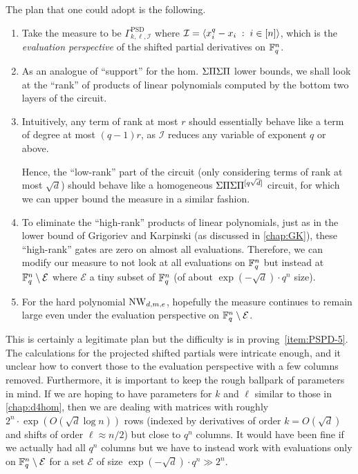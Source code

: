 \noindent 
The plan that one could adopt is the following. 
\begin{enumerate}
\itemsep 0pt
\item\label{item:PSPD-1} Take the measure to be $\Gamma^{\mathrm{PSD}}_{k,\ell,\mathcal{I}}$ where $\mathcal{I} = \left\langle x_i^q - x_i \;:\; i\in [n]\right\rangle$, which is the \emph{evaluation perspective} of the shifted partial derivatives on $\mathbb{F}_q^n$.
\item\label{item:PSPD-2} As an analogue of ``support'' for the hom. $\Sigma\Pi\Sigma\Pi$ lower bounds, we shall look at the ``rank'' of products of linear polynomials computed by the bottom two layers of the circuit. 
\item\label{item:PSPD-3} Intuitively, any term of rank at most $r$ should essentially behave like a term of degree at most $(q-1)r$, as $\mathcal{I}$ reduces any variable of exponent $q$ or above. 

Hence, the ``low-rank'' part of the circuit (only considering terms of rank at most $\sqrt{d}$) should behave like a homogeneous $\Sigma\Pi\Sigma\Pi^{[q\sqrt{d}]}$ circuit, for which we can upper bound the measure in a similar fashion. 
\item\label{item:PSPD-4} To eliminate the ``high-rank'' products of linear polynomials, just as in the lower bound of Grigoriev and Karpinski \cite{grigoriev98} (as discussed in \autoref{chap:GK}), these ``high-rank'' gates are zero on almost all evaluations. 
Therefore, we can modify our measure to not look at all evaluations on $\mathbb{F}_q^n$ but instead at $\mathbb{F}_q^n \setminus \mathcal{E}$ where $\mathcal{E}$ a tiny subset of $\mathbb{F}_q^n$ (of about $\exp(-\sqrt{d}) \cdot q^n$ size). 

\item\label{item:PSPD-5} For the hard polynomial $\operatorname{\mathrm{NW}}_{d,m,e}$, hopefully the measure continues to remain large even under the evaluation perspective on $\mathbb{F}_q^n \setminus \mathcal{E}$. 
\end{enumerate}

This is certainly a legitimate plan but the difficulty is in proving~\autoref{item:PSPD-5}.
The calculations for the projected shifted partials were intricate enough, and it unclear how to convert those to the evaluation perspective with a few columns removed.
Furthermore, it is important to keep the rough ballpark of parameters in mind.
If we are hoping to have parameters for $k$ and $\ell$ similar to those in \autoref{chap:d4hom}, then we are dealing with matrices with roughly $2^n \cdot \exp(O(\sqrt{d}\log n))$ rows (indexed by derivatives of order $k = O(\sqrt{d})$ and shifts of order $\ell \approx n/2$) but close to $q^n$ columns.
It would have been fine if we actually had all $q^n$ columns but we have to instead work with evaluations only on $\mathbb{F}_q^n \setminus \mathcal{E}$ for a set $\mathcal{E}$ of size $\exp{(-\sqrt{d})} \cdot q^n \gg 2^n$. 

